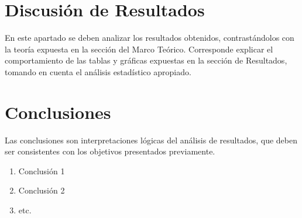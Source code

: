 \documentclass[letterpaper,11pt]{article}
\begin{document}
\section{Discusión de Resultados}
%
En este apartado se deben analizar los resultados obtenidos, contrastándolos con
la teoría expuesta en la sección del Marco Teórico. Corresponde explicar el
comportamiento de las tablas y gráficas expuestas en la sección de Resultados,
tomando en cuenta el análisis estadístico apropiado.
%
\section{Conclusiones}
%
Las conclusiones son interpretaciones lógicas del análisis de resultados, que
deben ser consistentes con los objetivos presentados previamente.
%
\begin{enumerate}
\item Conclusión 1
\item Conclusión 2
\item etc.
\end{enumerate}
%
\nocite{*}
%
%


%
\end{document}
